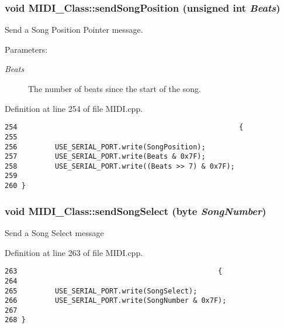 \hypertarget{class_m_i_d_i___class_0b9a6c3437016b8dc9678d6c43ca693f}{
\subsubsection[{sendSongPosition}]{\setlength{\rightskip}{0pt plus 5cm}void MIDI\_\-Class::sendSongPosition (unsigned int {\em Beats})}}
\label{class_m_i_d_i___class_0b9a6c3437016b8dc9678d6c43ca693f}


Send a Song Position Pointer message. \begin{Desc}
\item[Parameters:]
\begin{description}
\item[{\em Beats}]The number of beats since the start of the song. \end{description}
\end{Desc}


Definition at line 254 of file MIDI.cpp.

\begin{Code}\begin{verbatim}254                                                     {
255         
256         USE_SERIAL_PORT.write(SongPosition);
257         USE_SERIAL_PORT.write(Beats & 0x7F);
258         USE_SERIAL_PORT.write((Beats >> 7) & 0x7F);
259         
260 }
\end{verbatim}
\end{Code}


\hypertarget{class_m_i_d_i___class_0b957074192d439e8e69af9eef6fab77}{
\subsubsection[{sendSongSelect}]{\setlength{\rightskip}{0pt plus 5cm}void MIDI\_\-Class::sendSongSelect ({\bf byte} {\em SongNumber})}}
\label{class_m_i_d_i___class_0b957074192d439e8e69af9eef6fab77}


Send a Song Select message 

Definition at line 263 of file MIDI.cpp.

\begin{Code}\begin{verbatim}263                                                {
264         
265         USE_SERIAL_PORT.write(SongSelect);
266         USE_SERIAL_PORT.write(SongNumber & 0x7F);
267         
268 }
\end{verbatim}
\end{Code}


